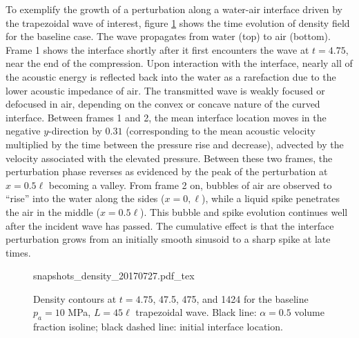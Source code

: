 To exemplify the growth of a perturbation along a water-air interface
driven by the trapezoidal wave of interest, figure
\ref{fig:interface_snapshots} shows the time evolution of density
field for the baseline case. The wave propagates from water (top) to
air (bottom). Frame 1 shows the interface shortly after it first
encounters the wave at $t=4.75$, near the end of the compression. Upon
interaction with the interface, nearly all of the acoustic energy is
reflected back into the water as a rarefaction due to the lower
acoustic impedance of air. The transmitted wave is weakly focused or
defocused in air, depending on the convex or concave nature of the
curved interface. Between frames 1 and 2, the mean interface location
moves in the negative $y$-direction by $0.31$ (corresponding to the
mean acoustic velocity multiplied by the time between the pressure
rise and decrease), advected by the velocity associated with the
elevated pressure. Between these two frames, the perturbation phase
reverses as evidenced by the peak of the perturbation at $x=0.5 \ell$
becoming a valley. From frame 2 on, bubbles of air are observed to
``rise'' into the water along the sides ($x=0, \ell$), while a liquid
spike penetrates the air in the middle ($x=0.5\ell$). This bubble and
spike evolution continues well after the incident wave has passed. The
cumulative effect is that the interface perturbation grows from an
initially smooth sinusoid to a sharp spike at late times.
% 
\begin{figure}
  \centering
  \def\svgwidth{0.95\textwidth}
  {snapshots_density_20170727.pdf_tex}
  \caption[The evolution of the acoustically perturbed interface]
          {Density contours at $t=4.75$, 47.5, 475, and 1424 for the
            baseline $p_a = 10$ MPa, $L=45\ell$ trapezoidal
            wave. Black line: $\alpha=0.5$ volume fraction isoline;
            black dashed line: initial interface location.}
  \label{fig:interface_snapshots}
\end{figure}

